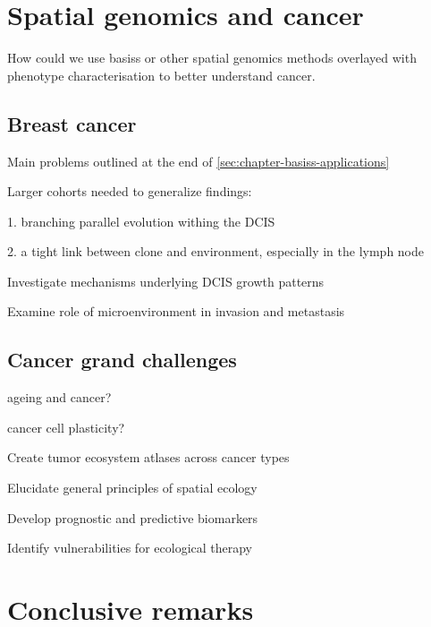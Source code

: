 \section{Spatial genomics and cancer}

How could we use basiss or other spatial genomics methods overlayed with phenotype characterisation to better understand cancer.

\subsection{Breast cancer}

Main problems outlined at the end of \cref{sec:chapter-basiss-applications}

Larger cohorts needed to generalize findings:

1. branching parallel evolution withing the DCIS

2. a tight link between clone and environment, especially in the lymph node

Investigate mechanisms underlying DCIS growth patterns

Examine role of microenvironment in invasion and metastasis

\subsection{Cancer grand challenges}

ageing and cancer?

cancer cell plasticity?



Create tumor ecosystem atlases across cancer types

Elucidate general principles of spatial ecology

Develop prognostic and predictive biomarkers

Identify vulnerabilities for ecological therapy

\section{Conclusive remarks}
